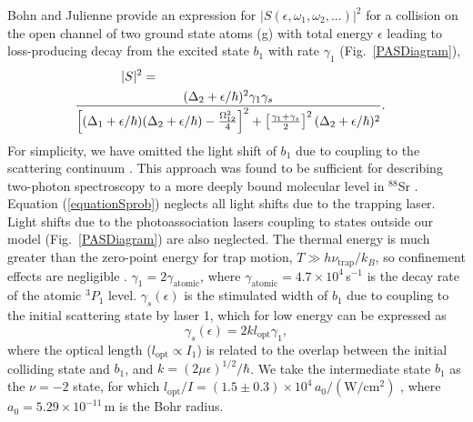 Bohn and Julienne \cite{bju96} provide an expression for $\vert S(\epsilon,\omega_1,\omega_2,...)\vert^2$ for a collision on the open channel of two ground state atoms (g) with total energy $\epsilon$ leading to loss-producing decay from the excited state $b_1$ with rate $\gamma_1$ (Fig.\ \ref{PASDiagram}),
\begin{eqnarray}
  \vert S\vert^2 =   \hspace{2.5in}&&\\
  {(\Delta_2+\epsilon/\hbar)^2{\gamma}_1{\gamma}_s \over
  	\left[(\Delta_1+\epsilon/\hbar)(\Delta_2+\epsilon/\hbar)-\frac{\Omega_{12}^{2}}{4}\right]^2+\left[ \frac{\gamma_1+\gamma_s}{2}\right]^2(\Delta_2+		 	\epsilon/\hbar)^2}. &&\nonumber
\end{eqnarray}
 For simplicity, we have omitted the light shift of $b_1$ due to coupling to the scattering continuum \cite{bju99}.  This approach was found to be sufficient for describing two-photon spectroscopy to a more deeply bound molecular level in $^{88}$Sr \cite{mmp08}. Equation (\ref{equationSprob}) neglects all light shifts due to the trapping laser. Light shifts due to the photoassociation lasers coupling to states outside our model (Fig.\ \ref{PASDiagram}) are also neglected. The thermal energy is much greater than the zero-point energy for trap motion, $T\gg h\nu_{\text{trap}}/k_B$, so confinement effects are negligible \cite{zbl06}.
${\gamma}_{1}=2\gamma_{\text{atomic}}$, where $\gamma_{\text{atomic}}=4.7\times 10^4$\,s$^{-1}$ is the decay rate of the atomic $^3P_1$ level. ${\gamma}_{s}(\epsilon)$ is the stimulated width of $b_1$ due to coupling to the initial scattering state by laser 1, which for low energy can be expressed as \cite{ctj06,bmc14,Pachomow2017a}
\begin{equation}\label{equationstimulatedwidth}
	{\gamma}_{s}(\epsilon)=2k l_{\text{opt}} \gamma_1,
\end{equation}
where the optical length ($l_{\text{opt}}\propto I_1$) is related to the overlap between the initial colliding state and $b_1$, and $k=(2\mu \epsilon)^{1/2}/\hbar$. We take the intermediate state $b_1$ as the $\nu=-2$ state, for which $l_{\text{opt}}/I=(1.5\pm0.3)\times 10^4\,a_0\mathrm{/(W/cm^2)}$ \cite{bmc14}, where $a_0=5.29\times 10^{-11}$\,m is the Bohr radius.

